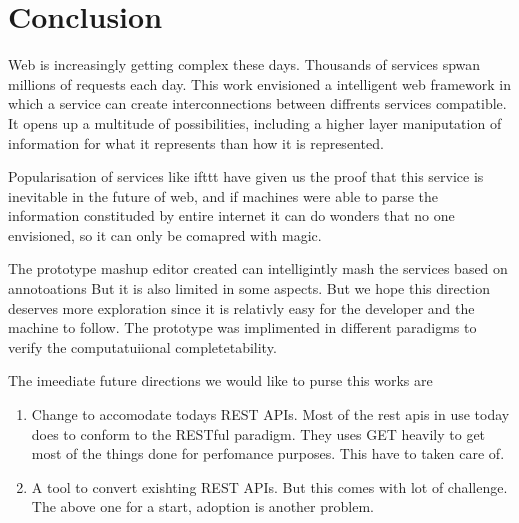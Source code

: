\chapter{Conclusion}
\begin{spacing}{1.5}
Web is increasingly getting complex these days. Thousands of services spwan millions of requests each day. This work envisioned a intelligent web framework in which a service can create interconnections between diffrents services compatible. It opens up a multitude of possibilities, including a higher layer maniputation of information for what it represents than how it is represented.

Popularisation of services like ifttt have given us the proof that this service is inevitable in the future of web, and if machines were able to parse the information constituded by entire internet it can do wonders that no one envisioned, so it can only be comapred with magic.

The prototype mashup editor created can intelligintly mash the services based on annotoations But it is also limited in some aspects. But we hope this  direction deserves more exploration since it is relativly easy for the developer and the machine to follow. The prototype was implimented in different paradigms to verify the computatuiional completetability.

The imeediate future directions we would like to purse this works are
\begin{enumerate}
\item Change to accomodate todays REST APIs. Most of the rest apis in use today does to conform to the RESTful paradigm. They uses GET heavily to get most of the things done for perfomance purposes. This have to taken care of.

\item A tool to convert exishting REST APIs.
But this comes with lot of challenge. The above one for a start, adoption is another problem.
\end{enumerate}
\end{spacing}